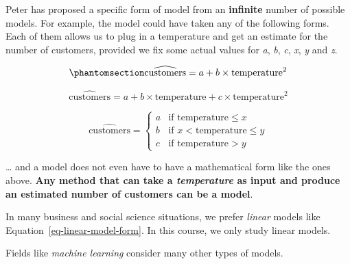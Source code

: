 \documentclass[
  12pt,
  letterpaper,
  DIV=11,
  numbers=noendperiod]{scrreprt}
\begin{document}
\begin{tcolorbox}[enhanced jigsaw, colback=white, leftrule=.75mm, toprule=.15mm, bottomtitle=1mm, breakable, coltitle=black, toptitle=1mm, title=\textcolor{quarto-callout-important-color}{\faExclamation}\hspace{0.5em}{Important}, opacitybacktitle=0.6, colbacktitle=quarto-callout-important-color!10!white, arc=.35mm, left=2mm, colframe=quarto-callout-important-color-frame, titlerule=0mm, rightrule=.15mm, bottomrule=.15mm, opacityback=0]

Peter has proposed a specific form of model from an \textbf{infinite}
number of possible models. For example, the model could have taken any
of the following forms. Each of them allows us to plug in a temperature
and get an estimate for the number of customers, provided we fix some
actual values for \emph{a}, \emph{b}, \emph{c}, \emph{x}, \emph{y} and
\emph{z}.

\begin{equation}\phantomsection\label{eq-linear-model-form}{
\widehat{\text{customers}} = a +  b\times\text{temperature}^2
}\end{equation}

\[
\widehat{\text{customers}} = a + b\times\text{temperature} + c\times\text{temperature}^2
\]

\[
\widehat{\text{customers}} =
\begin{cases}
a & \text{if } \text{temperature} \leq x \\
b & \text{if } x < \text{temperature} \leq y \\
c & \text{if } \text{temperature} > y
\end{cases}
\]

\ldots{} and a model does not even have to have a mathematical form like
the ones above. \textbf{Any method that can take a \emph{temperature} as
input and produce an estimated number of customers can be a model}.

\end{tcolorbox}

\begin{tcolorbox}[enhanced jigsaw, colback=white, leftrule=.75mm, toprule=.15mm, bottomtitle=1mm, breakable, coltitle=black, toptitle=1mm, title=\textcolor{quarto-callout-important-color}{\faExclamation}\hspace{0.5em}{Important}, opacitybacktitle=0.6, colbacktitle=quarto-callout-important-color!10!white, arc=.35mm, left=2mm, colframe=quarto-callout-important-color-frame, titlerule=0mm, rightrule=.15mm, bottomrule=.15mm, opacityback=0]

In many business and social science situations, we prefer \emph{linear}
models like Equation~\ref{eq-linear-model-form}. In this course, we only
study linear models.

Fields like \emph{machine learning} consider many other types of models.

\end{tcolorbox}
\end{document}
